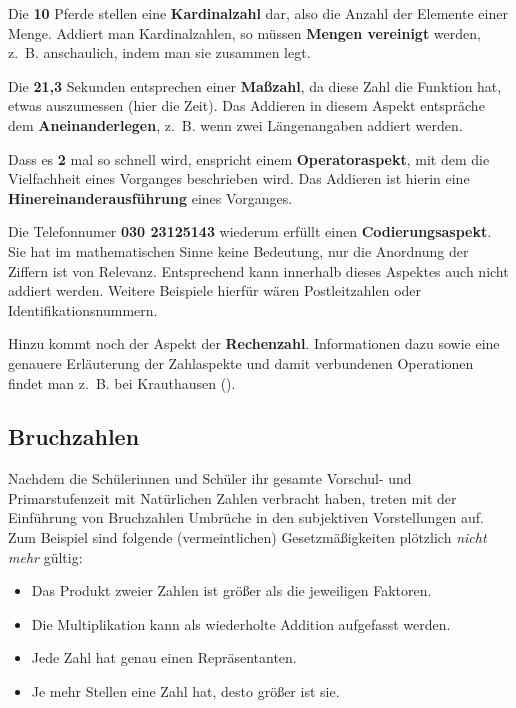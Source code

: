 \documentclass[
]{scrbook}
\providecommand{\tightlist}{%
  \setlength{\itemsep}{0pt}\setlength{\parskip}{0pt}}
\theoremstyle{definition}
\theoremstyle{definition}
\theoremstyle{definition}
\theoremstyle{definition}
\theoremstyle{remark}
\begin{document}
Die \textbf{10} Pferde stellen eine \textbf{Kardinalzahl} dar, also die Anzahl der Elemente einer Menge. Addiert man Kardinalzahlen, so müssen \textbf{Mengen vereinigt} werden, z.~B. anschaulich, indem man sie zusammen legt.

Die \textbf{21,3} Sekunden entsprechen einer \textbf{Maßzahl}, da diese Zahl die Funktion hat, etwas auszumessen (hier die Zeit). Das Addieren in diesem Aspekt entspräche dem \textbf{Aneinanderlegen}, z.~B. wenn zwei Längenangaben addiert werden.

Dass es \textbf{2} mal so schnell wird, enspricht einem \textbf{Operatoraspekt}, mit dem die Vielfachheit eines Vorganges beschrieben wird. Das Addieren ist hierin eine \textbf{Hinereinanderausführung} eines Vorganges.

Die Telefonnumer \textbf{030 23125143} wiederum erfüllt einen \textbf{Codierungsaspekt}. Sie hat im mathematischen Sinne keine Bedeutung, nur die Anordnung der Ziffern ist von Relevanz. Entsprechend kann innerhalb dieses Aspektes auch nicht addiert werden. Weitere Beispiele hierfür wären Postleitzahlen oder Identifikationsnummern.

Hinzu kommt noch der Aspekt der \textbf{Rechenzahl}. Informationen dazu sowie eine genauere Erläuterung der Zahlaspekte und damit verbundenen Operationen findet man z.~B. bei Krauthausen ().

\subsection{Bruchzahlen}\label{bruchzahlen}

Nachdem die Schülerinnen und Schüler ihr gesamte Vorschul- und Primarstufenzeit mit Natürlichen Zahlen verbracht haben, treten mit der Einführung von Bruchzahlen Umbrüche in den subjektiven Vorstellungen auf. Zum Beispiel sind folgende (vermeintlichen) Gesetzmäßigkeiten plötzlich \emph{nicht mehr} gültig:

\begin{itemize}
\tightlist
\item
  Das Produkt zweier Zahlen ist größer als die jeweiligen Faktoren.
\item
  Die Multiplikation kann als wiederholte Addition aufgefasst werden.
\item
  Jede Zahl hat genau einen Repräsentanten.
\item
  Je mehr Stellen eine Zahl hat, desto größer ist sie.
\end{itemize}
\end{document}
